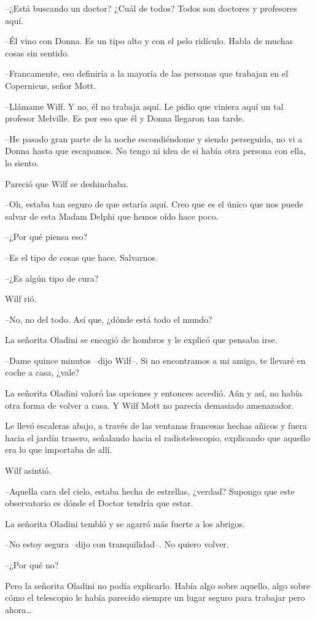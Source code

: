 --¿Está buscando un doctor? ¿Cuál de todos? Todos son doctores y
profesores aquí.

--Él vino con Donna. Es un tipo alto y con el pelo ridículo. Habla de
muchas cosas sin sentido.

--Francamente, eso definiría a la mayoría de las personas que trabajan
en el Copernicus, señor Mott.

--Llámame Wilf. Y no, él no trabaja aquí. Le pidio que viniera aquí un
tal profesor Melville. Es por eso que él y Donna llegaron tan tarde.

--He pasado gran parte de la noche escondiéndome y siendo perseguida, no
vi a Donna hasta que escapamos. No tengo ni idea de si había otra
persona con ella, lo siento.

Pareció que Wilf se deshinchaba.

--Oh, estaba tan seguro de que estaría aquí. Creo que es el único que
nos puede salvar de esta Madam Delphi que hemos oído hace poco.

--¿Por qué piensa eso?

--Es el tipo de cosas que hace. Salvarnos.

--¿Es algún tipo de cura?

Wilf rió.

--No, no del todo. Así que, ¿dónde está todo el mundo?

La señorita Oladini se encogió de hombros y le explicó que pensaba irse.

--Dame quince minutos --dijo Wilf--. Si no encontramos a mi amigo, te
llevaré en coche a casa, ¿vale?

La señorita Oladini valoró las opciones y entonces accedió. Aún y así,
no había otra forma de volver a casa. Y Wilf Mott no parecía demasiado
amenazador.

Le llevó escaleras abajo, a través de las ventanas francesas hechas
añicos y fuera hacia el jardín trasero, señalando hacia el
radiotelescopio, explicando que aquello era lo que importaba de allí.

Wilf asintió.

--Aquella cara del cielo, estaba hecha de estrellas, ¿verdad? Supongo
que este observatorio es dónde el Doctor tendría que estar.

La señorita Oladini tembló y se agarró más fuerte a los abrigos.

--No estoy segura --dijo con tranquilidad--. No quiero volver.

--¿Por qué no?

Pero la señorita Oladini no podía explicarlo. Había algo sobre aquello,
algo sobre cómo el telescopio le había parecido siempre un lugar seguro
para trabajar pero ahora\ldots{}

